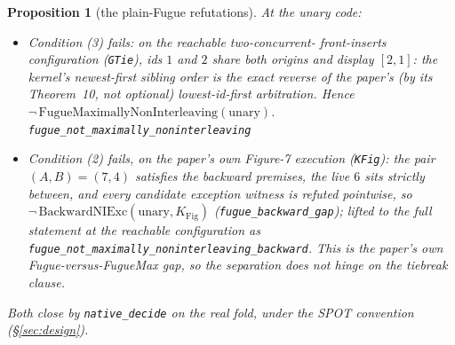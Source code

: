 \documentclass[11pt]{article}
\newtheorem{proposition}[theorem]{Proposition}
\newcommand{\lean}[1]{\texttt{#1}}
\begin{document}
\begin{proposition}[the plain-Fugue refutations]
\label{prop:fuguerefuted}
At the unary code:
\begin{itemize}[leftmargin=2em]
\item \emph{Condition (3) fails}: on the reachable two-concurrent-%
front-inserts configuration (\lean{GTie}), ids $1$ and $2$ share
both origins and display $[2, 1]$: the kernel's newest-first sibling
order is the exact reverse of the paper's (by its Theorem~10, not
optional) lowest-id-first arbitration. Hence
$\neg\,\mathrm{FugueMaximallyNonInterleaving}(\mathrm{unary})$.
\hfill\lean{fugue\_not\_maximally\_noninterleaving}
\item \emph{Condition (2) fails}, on the paper's own Figure-7
execution (\lean{KFig}): the pair $(A, B) = (7, 4)$ satisfies the
backward premises, the live $6$ sits strictly between, and every
candidate exception witness is refuted pointwise, so
$\neg\,\mathrm{BackwardNIExc}(\mathrm{unary}, K_{\mathrm{Fig}})$
(\lean{fugue\_backward\_gap}); lifted to the full statement at the
reachable configuration as
\lean{fugue\_not\_maximally\_noninterleaving\_backward}. This is
the paper's own Fugue-versus-FugueMax gap, so the separation does
not hinge on the tiebreak clause.
\end{itemize}
Both close by \lean{native\_decide} on the real fold, under the SPOT
convention (\S\ref{sec:design}).
\end{proposition}
\end{document}
